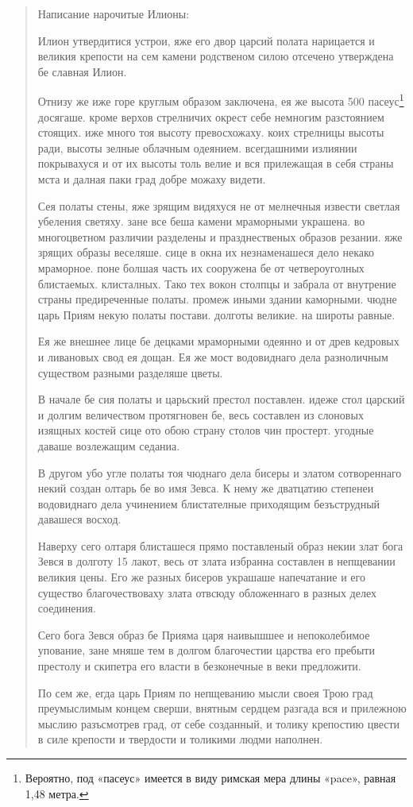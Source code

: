 \begin{quotation}
Написание нарочитые Илионы:

Илион утвердитися устрои, яже его двор царсий полата нарицается и великия крепости на сем камени родственом силою отсечено утверждена бе славная Илион. 

Отнизу же иже горе круглым образом заключена, ея же высота 500 пасеус\footnote{Вероятно, под «пасеус» имеется в виду римская мера длины «pace», равная 1,48 метра.} досягаше. кроме верхов стрелничих окрест себе немногим разстоянием стоящих. иже много тоя высоту превосхожаху. коих стрелницы высоты ради, высоты зелные облачным одеянием. всегдашними излиянии покрывахуся и от их высоты толь велие и вся прилежащая в себя страны мста и далная паки град добре можаху видети.

Сея полаты стены, яже зрящим видяхуся не от мелнечныя извести светлая убеления светяху. зане все беша камени мраморными украшена. во многоцветном различии разделены и празднественых образов резании. яже зрящих образы веселяше. сице в окна их незнаменашеся дело некако мраморное. поне болшая часть их сооружена бе от четвероуголных блистаемых. клисталных. Тако тех вокон столпцы и забрала от внутрение страны предиреченные полаты. промеж иными здании каморными. чюдне царь Приям некую полаты постави. долготы великие. на широты равные. 

Ея же внешнее лице бе децками мраморными одеянно  и от древ кедровых и ливановых свод ея дощан. Ея же мост водовиднаго дела разноличным существом разными разделяше цветы.

В начале бе сия полаты и царьский престол поставлен. идеже стол царский и долгим величеством протягновен бе, весь составлен из слоновых изящных костей сице ото обою страну столов чин простерт. угодные даваше возлежащим седаниа.

В другом убо угле полаты тоя чюднаго дела бисеры и златом сотвореннаго некий создан олтарь бе во имя Зевса. К нему же дватцатию степенеи водовиднаго дела учинением блистателные приходящим безъструдный давашеся восход.

Наверху сего олтаря блисташеся прямо поставленый образ некии злат бога Зевся в долготу 15 лакот, весь от злата избранна составлен в непщевании великия цены. Его же разных бисеров украшаше напечатание и его существо благочествоваху злата отвсюду обложеннаго в разных делех соединения.

Сего бога Зевся образ бе Прияма царя наивышшее и непоколебимое упование, зане мняше тем в долгом благочестии царства его пребыти престолу и скипетра его власти в безконечные в веки предложити.

По сем же, егда царь Приям по непщеванию мысли своея Трою град преумыслимым концем сверши, внятным сердцем разгада вся и прилежною мыслию разъсмотрев град, от себе созданный, и толику крепостию цвести в силе крепости и твердости и толикими людми наполнен.
\end{quotation}

